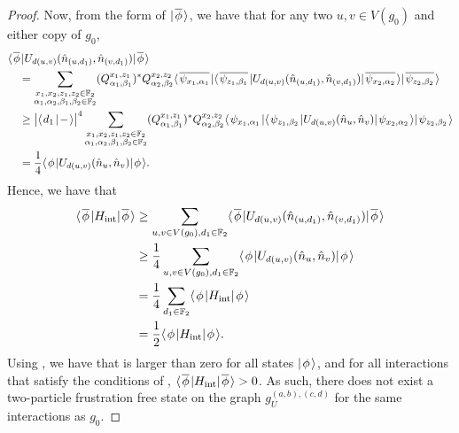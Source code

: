 \documentclass[../thesis-main/thesis-main]{subfiles}
\begin{document}
\begin{proof}
  Now, from the form of $|\mspace{2mu} \overline{\phi} \mspace{2mu} \rangle$, we have that for any two $u,v\in V(g_0)$ and either copy of $g_0$,
  \begin{align}
    &\langle\mspace{2mu} \overline{\phi} \mspace{2mu} | U_{d(u,v)} (\hat{n}_{(u,d_1)},\hat{n}_{(v,d_1)}) |\mspace{2mu} \overline{\phi} \mspace{2mu} \rangle \nonumber\\
    &\quad = \sum_{\substack{x_1,x_2,z_1,z_2\in\mathbb{F}_2\\\alpha_1,\alpha_2,\beta_1,\beta_2\in\mathbb{F}_2}}
    (Q_{\alpha_1,\beta_1}^{x_1,z_1})^* Q_{\alpha_2,\beta_2}^{x_2,z_2} \langle\mspace{2mu} \overline{\psi_{x_1,\alpha_1}} \mspace{2mu} |\langle\mspace{2mu} \overline{\psi_{z_1,\beta_1}} \mspace{2mu} | U_{d(u,v)}(\hat{n}_{(u,d_1)},\hat{n}_{(v,d_1)}) |\mspace{2mu} \overline{\psi_{x_2,\alpha_2}} \mspace{2mu} \rangle|\mspace{2mu} \overline{\psi_{z_2,\beta_2}} \mspace{2mu} \rangle\\
    &\quad \geq \big|\langle\mspace{2mu} d_1 \mspace{2mu} | \mspace{2mu} -\mspace{2mu} \rangle\big|^4\sum_{\substack{x_1,x_2,z_1,z_2\in\mathbb{F}_2\\\alpha_1,\alpha_2,\beta_1,\beta_2\in\mathbb{F}_2}}
    (Q_{\alpha_1,\beta_1}^{x_1,z_1})^* Q_{\alpha_2,\beta_2}^{x_2,z_2} \langle\mspace{2mu} \psi_{x_1,\alpha_1} \mspace{2mu} |\langle\mspace{2mu} \psi_{z_1,\beta_2} \mspace{2mu} | U_{d(u,v)}(\hat{n}_{u},\hat{n}_{v}) |\mspace{2mu} \psi_{x_2,\alpha_2} \mspace{2mu} \rangle|\mspace{2mu} \psi_{z_2,\beta_2} \mspace{2mu} \rangle\\
    &\quad = \frac{1}{4} \langle\mspace{2mu} \phi \mspace{2mu} | U_{d(u,v)}(\hat{n}_u,\hat{n}_v)|\mspace{2mu} \phi \mspace{2mu} \rangle.
  \end{align}
  Hence, we have that
  \begin{align}
    \langle\mspace{2mu} \overline{\phi} \mspace{2mu} | H_{\text{int}} |\mspace{2mu} \overline{\phi} \mspace{2mu} \rangle& \geq  \sum_{u,v\in V(g_0),d_1\in \mathbb{F}_2} \langle\mspace{2mu} \overline{\phi} \mspace{2mu} | U_{d(u,v)} (\hat{n}_{(u,d_1)},\hat{n}_{(v,d_1)}) |\mspace{2mu} \overline{\phi} \mspace{2mu} \rangle\\
     &\geq \frac{1}{4} \sum_{u,v\in V(g_0), d_1\in \mathbb{F}_2} \langle\mspace{2mu} \phi \mspace{2mu} | U_{d(u,v)}(\hat{n}_u,\hat{n}_v) |\mspace{2mu} \phi \mspace{2mu} \rangle\\
     &= \frac{1}{4} \sum_{d_1\in \mathbb{F}_2} \langle\mspace{2mu} \phi \mspace{2mu} | H_{\text{int}} |\mspace{2mu} \phi \mspace{2mu} \rangle\\
     &= \frac{1}{2} \langle\mspace{2mu} \phi \mspace{2mu} | H_{\text{int}} |\mspace{2mu} \phi \mspace{2mu} \rangle\label{eq:g0_and_diagram_element_relation}.
  \end{align}
  Using , we have that  is larger than zero for all states $|\mspace{2mu} \phi \mspace{2mu} \rangle$, and for all interactions that satisfy the conditions of , $\langle\mspace{2mu} \overline{\phi} \mspace{2mu} | H_{\text{int}} |\mspace{2mu} \overline{\phi} \mspace{2mu} \rangle >0$.  As such, there does not exist a two-particle frustration free state on the graph $g_U^{(a,b),(c,d)}$ for the same interactions as $g_0$.

\end{proof}

\end{document}
